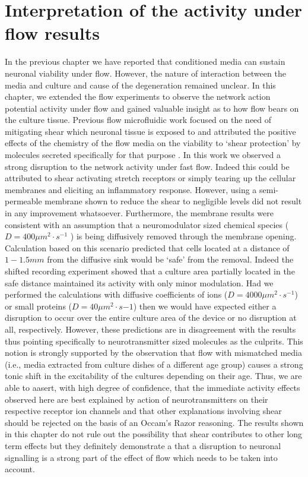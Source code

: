 \section{Interpretation of the activity under flow results}
\label{sec:crossFlow:interp}
In the previous chapter we have reported that conditioned media can sustain neuronal viability under flow. However, the nature of interaction between the media and culture and cause of the degeneration remained unclear. In this chapter, we extended the flow experiments to observe the network action potential activity under flow and gained valuable insight as to how flow bears on the culture tissue. Previous flow microfluidic work focused on the need of mitigating shear \cite{morel2012amplification,wang2008microfluidics} which neuronal tissue is exposed to and attributed the positive effects of the chemistry of the flow media on the viability to `shear protection' by molecules secreted specifically for that purpose \cite{liu2013galanin}. In this work we observed a strong disruption to the network activity under fast flow. Indeed this could be attributed to shear activating stretch receptors or simply tearing up the cellular membranes and eliciting an inflammatory response. However, using a semi-permeable membrane shown to reduce the shear to negligible levels \cite{morel2012concentration} did not result in any improvement whatsoever. Furthermore, the membrane results were consistent with an assumption that a neuromodulator sized chemical species (\(D=400 \mu m^{2}\cdot s^{-1}\) \cite{johnstoneThesis}) is being diffusively removed through the membrane opening. Calculation based on this scenario predicted that cells located at a distance of \(1-1.5 mm\) from the diffusive sink would be `safe' from the removal. Indeed the shifted recording experiment showed that a culture area partially located in the safe distance maintained its activity with only minor modulation. Had we performed the calculations with diffusive coefficients of ions (\(D=4000 \mu m^{2}\cdot s^{-1}\)) or small proteins  (\(D=40 \mu m^{2}\cdot s{-1}\)) then we would have expected either a disruption to occur over the entire culture area of the device or no disruption at all, respectively. However, these predictions are in disagreement with the results thus pointing specifically to neurotransmitter sized molecules as the culprits. This notion is strongly supported by the observation that flow with mismatched media (i.e., media extracted from culture dishes of a different age group) causes a strong tonic shift in the excitability of the cultures depending on their age. Thus, we are able to aasert, with high degree of confidence, that the immediate activity effects observed here are best explained by action of neurotransmitters on their respective receptor ion channels and that other explanations involving shear should be rejected on the basis of an Occam's Razor reasoning. The results shown in this chapter do not rule out the possibility that shear contributes to other long term effects but they definitely demonstrate a that a disruption to neuronal signalling is a strong part of the effect of flow which  needs to be taken into account.

